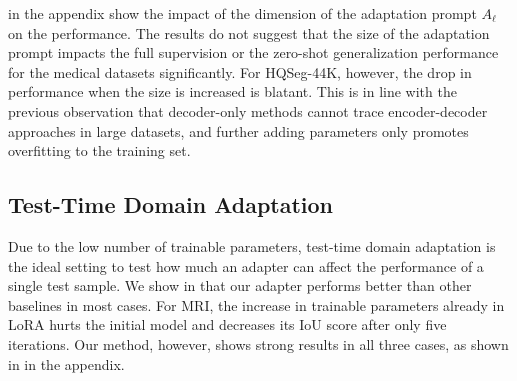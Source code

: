  in the appendix show the impact of the dimension of the adaptation prompt $A_\ell$ on the performance. The results do not suggest that the size of the adaptation prompt impacts the full supervision or the zero-shot generalization performance for the medical datasets significantly. For HQSeg-44K, however, the drop in performance when the size is increased is blatant. This is in line with the previous observation that decoder-only methods cannot trace encoder-decoder approaches in large datasets, and further adding parameters only promotes overfitting to the training set.

\subsection{Test-Time Domain Adaptation}
Due to the low number of trainable parameters, test-time domain adaptation is the ideal setting to test how much an adapter can affect the performance of a single test sample. We show in  that our adapter performs better than other baselines in most cases. For MRI, the increase in trainable parameters already in LoRA hurts the initial model and decreases its IoU score after only five iterations. Our method, however, shows strong results in all three cases, as shown in  in the appendix.


